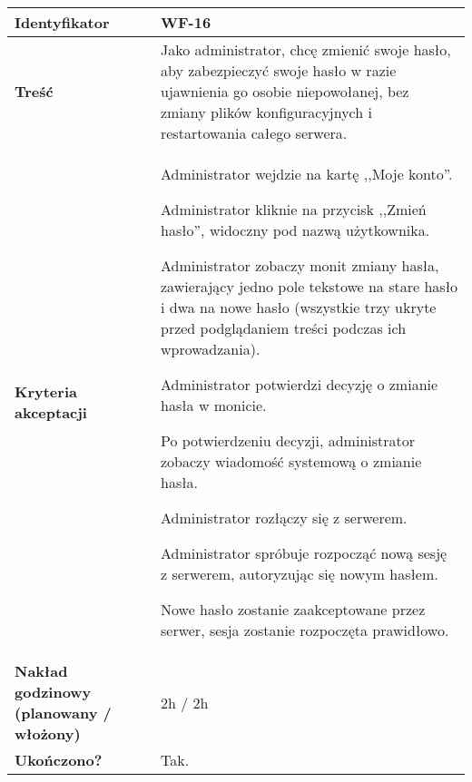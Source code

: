 \begin{tabular}{ | l | l | }
	\hline
		\textbf{Identyfikator} &
		WF-16
		\\

	\hline
		\textbf{Treść} & \parbox[t]{11.5cm}{\strut
			Jako administrator, chcę zmienić swoje hasło, aby zabezpieczyć swoje hasło w razie ujawnienia go osobie niepowołanej, bez zmiany plików konfiguracyjnych i restartowania całego serwera.
		\strut}\\

	\hline
		\parbox[t]{4cm}{\textbf{Kryteria akceptacji}} & \parbox[t]{11.5cm}{\strut
			\begin{enumreq}
				\item Administrator wejdzie na kartę ,,Moje konto''.
        \item Administrator kliknie na przycisk ,,Zmień hasło'',
        widoczny pod nazwą użytkownika.
				\item Administrator zobaczy monit zmiany hasła,
        zawierający jedno pole tekstowe na stare hasło i dwa na
        nowe hasło (wszystkie trzy ukryte przed podglądaniem
        treści podczas ich wprowadzania).
        \item Administrator potwierdzi decyzję o zmianie hasła w monicie.
        \item Po potwierdzeniu decyzji, administrator zobaczy wiadomość systemową o zmianie hasła.
        \item Administrator rozłączy się z serwerem.
        \item Administrator spróbuje rozpocząć nową sesję z
        serwerem, autoryzując się nowym hasłem.
        \item Nowe hasło zostanie zaakceptowane przez serwer,
        sesja zostanie rozpoczęta prawidłowo.
			\end{enumreq}
			\strut}
		\\

	\hline
  \parbox[t]{4cm}{\textbf{Nakład godzinowy (planowany / włożony)}} &
  \parbox[t]{11.5cm}{\strut
    2h / 2h
  \strut}\\

  \hline
    \parbox[t]{4cm}{\textbf{Ukończono?}} &
    \parbox[t]{11.5cm}{\strut
      Tak.
    \strut}\\
\hline
\end{tabular}

\vspace{1em}


